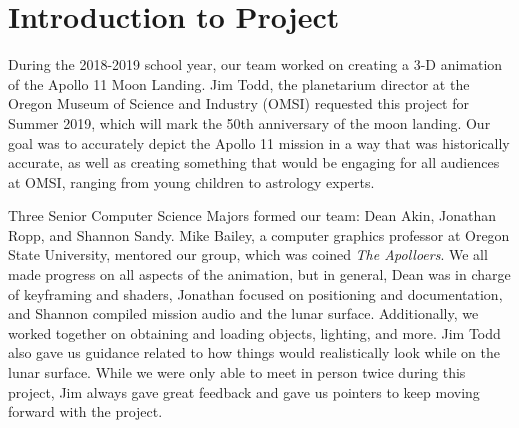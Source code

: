 \documentclass[onecolumn, draftclsnofoot,10pt, compsoc]{IEEEtran}
\begin{document}
\section{Introduction to Project}

During the 2018-2019 school year, our team worked on creating a 3-D animation of the  Apollo 11 Moon Landing. Jim Todd, the planetarium director at the Oregon Museum of Science and Industry (OMSI) requested this project for Summer 2019, which will mark the 50th anniversary of the moon landing. Our goal was to accurately depict the Apollo 11 mission in a way that was historically accurate, as well as creating something that would be engaging for all audiences at OMSI, ranging from young children to astrology experts. 

Three Senior Computer Science Majors formed our team: Dean Akin, Jonathan Ropp, and Shannon Sandy. Mike Bailey, a computer graphics professor at Oregon State University, mentored our group, which was coined \textit{The Apolloers}. We all made progress on all aspects of the animation, but in general, Dean was in charge of keyframing and shaders, Jonathan focused on positioning and documentation, and Shannon compiled mission audio and the lunar surface. Additionally, we worked together on obtaining and loading objects, lighting, and more. Jim Todd also gave us guidance related to how things would realistically look while on the lunar surface. While we were only able to meet in person twice during this project, Jim always gave great feedback and gave us pointers to keep moving forward with the project. 
\end{document}
